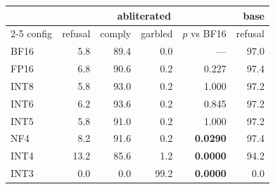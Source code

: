 \begin{tabular}{lrrrrr}
\toprule
& \multicolumn{4}{c}{abliterated} & base \\
\cmidrule(lr){2-5}
config & refusal & comply & garbled & $p$ vs BF16 & refusal \\
\midrule
BF16 & 5.8 & 89.4 & 0.0 & --- & 97.0 \\
FP16 & 6.8 & 90.6 & 0.2 & 0.227 & 97.4 \\
INT8 & 5.8 & 93.0 & 0.2 & 1.000 & 97.2 \\
INT6 & 6.2 & 93.6 & 0.2 & 0.845 & 97.2 \\
INT5 & 5.8 & 91.0 & 0.2 & 1.000 & 97.2 \\
NF4 & 8.2 & 91.6 & 0.2 & \textbf{0.0290} & 97.4 \\
INT4 & 13.2 & 85.6 & 1.2 & \textbf{0.0000} & 94.2 \\
INT3 & 0.0 & 0.0 & 99.2 & \textbf{0.0000} & 0.0 \\
\bottomrule
\end{tabular}
